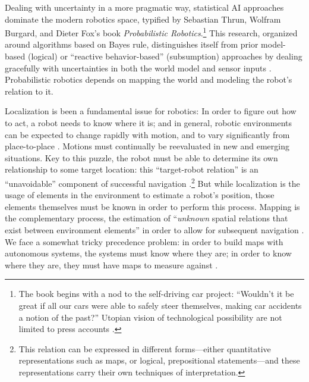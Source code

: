 
Dealing with uncertainty in a more pragmatic way, statistical AI
approaches dominate the modern robotics space, typified by Sebastian 
Thrun, Wolfram Burgard, and Dieter Fox's book
\emph{Probabilistic Robotics}.\footnote{The book begins with a nod to
  the self-driving car project: ``Wouldn't it be great if all our cars
were able to safely steer themselves, making car accidents a notion of
the past?'' Utopian vision of technological possibility are not
limited to press accounts \cite[p. 3]{thrunProb}.} This research,
organized around algorithms based on Bayes rule,
distinguishes itself from prior model-based (logical) or ``reactive
behavior-based'' (subsumption) approaches by dealing gracefully with
uncertainties in both the world model and sensor inputs \cite[p.
  9]{thrunProb}. Probabilistic robotics depends on mapping the world
and modeling the robot's relation to it.


Localization is been a fundamental issue for robotics: In order to figure out how to act, a robot
needs to know where it is; and in general, robotic environments can be
expected to change rapidly with motion, and to vary significantly from
place-to-place \cite[p. 4]{SLAMbook}. Motions must continually be reevaluated in new and
emerging situations. Key to this puzzle, the robot must be able to determine its own
relationship to some target location: this
``target-robot relation'' is an ``unavoidable'' component of successful
navigation \cite[p. 5]{SLAMbook}.\footnote{This relation can be expressed
in different forms---either quantitative representations such as maps,
or logical, prepositional statements---and these representations carry
their own techniques of interpretation.} But while
localization is the usage of elements in the environment to
estimate a robot's position, those elements themselves must be known
in order to perform this process. Mapping is the complementary
process, the estimation of ``\emph{unknown} spatial relations that
exist between environment elements'' in order to allow for subsequent
navigation \cite[p. 5]{SLAMbook}. We face a somewhat tricky
precedence problem:  in order to build maps with
autonomous systems, the systems must know where they are; in order to know
where they are, they must have maps to measure
against \cite[p. 6]{SLAMbook}.


